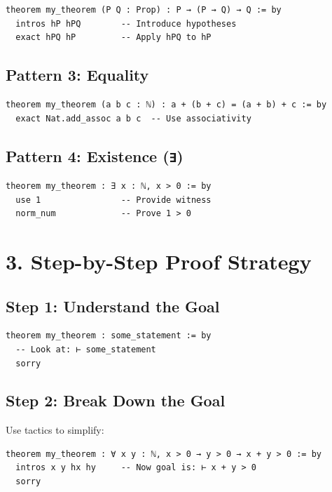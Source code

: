 \documentclass{amsart}
\theoremstyle{plain}
\theoremstyle{definition}
\theoremstyle{remark}
\begin{document}
\begin{lstlisting}[language=lean]
theorem my_theorem (P Q : Prop) : P → (P → Q) → Q := by
  intros hP hPQ        -- Introduce hypotheses
  exact hPQ hP         -- Apply hPQ to hP
\end{lstlisting}
\subsection{\textbf{Pattern 3: Equality}}

\begin{lstlisting}[language=lean]
theorem my_theorem (a b c : ℕ) : a + (b + c) = (a + b) + c := by
  exact Nat.add_assoc a b c  -- Use associativity
\end{lstlisting}
\subsection{\textbf{Pattern 4: Existence (\lstinline{∃})}}

\begin{lstlisting}[language=lean]
theorem my_theorem : ∃ x : ℕ, x > 0 := by
  use 1                -- Provide witness
  norm_num             -- Prove 1 > 0
\end{lstlisting}

\section{\textbf{3. Step-by-Step Proof Strategy}}

\subsection{\textbf{Step 1: Understand the Goal}}

\begin{lstlisting}[language=lean]
theorem my_theorem : some_statement := by
  -- Look at: ⊢ some_statement
  sorry
\end{lstlisting}
\subsection{\textbf{Step 2: Break Down the Goal}}

Use tactics to simplify:

\begin{lstlisting}[language=lean]
theorem my_theorem : ∀ x y : ℕ, x > 0 → y > 0 → x + y > 0 := by
  intros x y hx hy     -- Now goal is: ⊢ x + y > 0
  sorry
\end{lstlisting}
\end{document}
